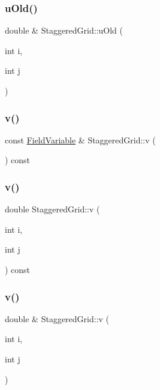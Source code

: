 \subsubsection{\texorpdfstring{uOld()}{uOld()}\hspace{0.1cm}{\footnotesize\ttfamily [3/3]}}
{\footnotesize\ttfamily double \& Staggered\+Grid\+::u\+Old (\begin{DoxyParamCaption}\item[{int}]{i,  }\item[{int}]{j }\end{DoxyParamCaption})}

\mbox{\label{classStaggeredGrid_a26e478abba632554652c9e05a279d1ca}} 
\subsubsection{\texorpdfstring{v()}{v()}\hspace{0.1cm}{\footnotesize\ttfamily [1/3]}}
{\footnotesize\ttfamily const \mbox{\hyperlink{classFieldVariable}{Field\+Variable}} \& Staggered\+Grid\+::v (\begin{DoxyParamCaption}{ }\end{DoxyParamCaption}) const}

\mbox{\label{classStaggeredGrid_ac052d8803ff950aee04b86ac026c516b}} 
\subsubsection{\texorpdfstring{v()}{v()}\hspace{0.1cm}{\footnotesize\ttfamily [2/3]}}
{\footnotesize\ttfamily double Staggered\+Grid\+::v (\begin{DoxyParamCaption}\item[{int}]{i,  }\item[{int}]{j }\end{DoxyParamCaption}) const}

\mbox{\label{classStaggeredGrid_a7746f703f32c2f20a4c77246eebac697}} 
\subsubsection{\texorpdfstring{v()}{v()}\hspace{0.1cm}{\footnotesize\ttfamily [3/3]}}
{\footnotesize\ttfamily double \& Staggered\+Grid\+::v (\begin{DoxyParamCaption}\item[{int}]{i,  }\item[{int}]{j }\end{DoxyParamCaption})}

